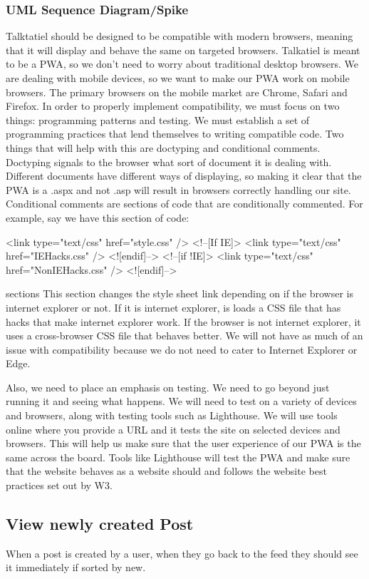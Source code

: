 \documentclass[12pt]{article}
\begin{document}
\subsubsection{UML Sequence Diagram/Spike}
Talktatiel should be designed to be compatible with modern browsers, meaning that it will display and behave the same on targeted browsers.  Talkatiel is meant to be a PWA, so we don’t need to worry about traditional desktop browsers.  We are dealing with mobile devices, so we want to make our PWA work on mobile browsers.  The primary browsers on the mobile market are Chrome, Safari and Firefox.  In order to properly implement compatibility, we must focus on two things: programming patterns and testing.  We must establish a set of programming practices that lend themselves to writing compatible code.  Two things that will help with this are doctyping and conditional comments.  Doctyping signals to the browser what sort of document it is dealing with.  Different documents have different ways of displaying, so making it clear that the PWA is a .aspx and not .asp will result in browsers correctly handling our site.  Conditional comments are sections of code that are conditionally commented.  For example, say we have this section of code:

<link type="text/css" href="style.css" />
<!--[If IE]>
<link type="text/css" href="IEHacks.css" />
<![endif]-->
<!--[if !IE]>
<link type="text/css" href="NonIEHacks.css" />
<![endif]-->

sections This section changes the style sheet link depending on if the browser is internet explorer or not.  If it is internet explorer, is loads a CSS file that has hacks that make internet explorer work.  If the browser is not internet explorer, it uses a cross-browser CSS file that behaves better.  We will not have as much of an issue with compatibility because we do not need to cater to Internet Explorer or Edge.

Also, we need to place an emphasis on testing.  We need to go beyond just running it and seeing what happens.  We will need to test on a variety of devices and browsers, along with testing tools such as Lighthouse.  We will use tools online where you provide a URL and it tests the site on selected devices and browsers.  This will help us make sure that the user experience of our PWA is the same across the board.  Tools like Lighthouse will test the PWA and make sure that the website behaves as a website should and follows the website best practices set out by W3.


\subsection{View newly created Post}
When a post is created by a user, when they go back to the feed they should see
it immediately if sorted by new.
\end{document}

